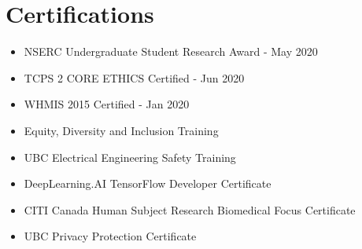 \section{Certifications}

\vspace{-15pt}
\begin{multicols}{2}
    {}\vspace{-8pt}\begin{itemize}
    \setlength\itemsep{-2pt}
        \item\small{{NSERC Undergraduate Student Research Award - May 2020}}
        \item\small{{TCPS 2 CORE ETHICS Certified - Jun 2020}}
        \item\small{{WHMIS 2015 Certified - Jan 2020}}
        \item\small{{Equity, Diversity and Inclusion Training }}
        \end{itemize}\vspace{-5pt}
    {}\vspace{-8pt}\begin{itemize}
    \setlength\itemsep{-2pt}
        \item\small{{UBC Electrical Engineering Safety Training}}
        \item\small{{DeepLearning.AI TensorFlow Developer Certificate}}
        \item\small{{CITI Canada Human Subject Research Biomedical Focus Certificate}}
        \item \small{{UBC Privacy Protection Certificate}}
    \end{itemize}\vspace{-5pt}
\end{multicols}

 
\vspace{-0.6cm}